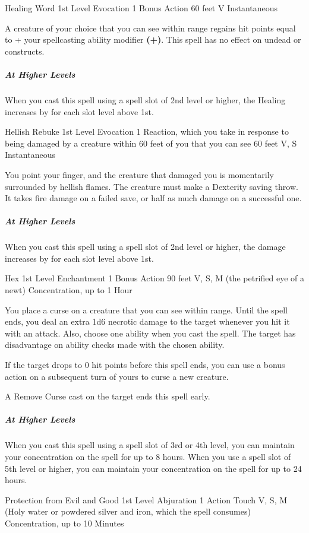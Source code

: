 \documentclass[letterpaper,openany,oneside,twocolumn]{book}
\begin{document}
\DndSpellHeader
  {Healing Word}
  {1st Level Evocation}
  {1 Bonus Action}
  {60 feet}
  {V}
  {Instantaneous}

A creature of your choice that you can see within range regains hit points equal to  + your spellcasting ability modifier \textbf{(+)}. This spell has no effect on undead or constructs.

\subparagraph*{At Higher Levels} When you cast this spell using a spell slot of 2nd level or higher, the Healing increases by  for each slot level above 1st.

\DndSpellHeader
  {Hellish Rebuke}
  {1st Level Evocation}
  {1 Reaction, which you take in response to being damaged by a creature within 60 feet of you that you can see}
  {60 feet}
  {V, S}
  {Instantaneous}

You point your finger, and the creature that damaged you is momentarily surrounded by hellish flames. The creature must make a Dexterity saving throw. It takes  fire damage on a failed save, or half as much damage on a successful one.

\subparagraph*{At Higher Levels} When you cast this spell using a spell slot of 2nd level or higher, the damage increases by  for each slot level above 1st.

\DndSpellHeader
  {Hex}
  {1st Level Enchantment}
  {1 Bonus Action}
  {90 feet}
  {V, S, M (the petrified eye of a newt)}
  {Concentration, up to 1 Hour}
  
You place a curse on a creature that you can see within range. Until the spell ends, you deal an extra 1d6 necrotic damage to the target whenever you hit it with an attack. Also, choose one ability when you cast the spell. The target has disadvantage on ability checks made with the chosen ability.

If the target drops to 0 hit points before this spell ends, you can use a bonus action on a subsequent turn of yours to curse a new creature.

A Remove Curse cast on the target ends this spell early.

\subparagraph*{At Higher Levels} When you cast this spell using a spell slot of 3rd or 4th level, you can maintain your concentration on the spell for up to 8 hours. When you use a spell slot of 5th level or higher, you can maintain your concentration on the spell for up to 24 hours.

\DndSpellHeader
  {Protection from Evil and Good}
  {1st Level Abjuration}
  {1 Action}
  {Touch}
  {V, S, M (Holy water or powdered silver and iron, which the spell consumes)}
  {Concentration, up to 10 Minutes}
  
\end{document}
